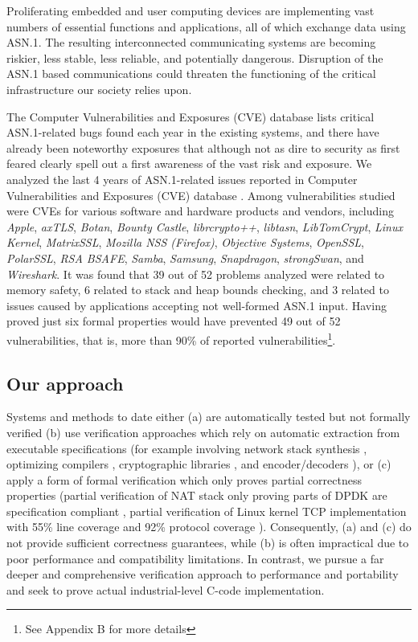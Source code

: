 \documentclass[acmsmall,nonacm]{acmart}
\begin{document}
Proliferating embedded and user computing devices are implementing
vast numbers of essential functions and applications, all of which
exchange data using ASN.1. The resulting interconnected communicating
systems are becoming riskier, less stable, less reliable, and
potentially dangerous. Disruption of the ASN.1 based communications
could threaten the functioning of the critical infrastructure our
society relies upon.


The Computer Vulnerabilities and Exposures (CVE) database
\cite{CVE} lists critical ASN.1-related bugs found each year in
the existing systems, and there have already been noteworthy exposures
\cite{OpenSSLMemoryCorruption} that although not as dire to security as first feared
\cite{ASN1Flaw} clearly spell out a first awareness of the vast risk and
exposure. We analyzed the last 4 years of ASN.1-related issues
reported in Computer Vulnerabilities and Exposures (CVE) database
\cite{CVEaddon}. Among vulnerabilities studied were CVEs for various
software and hardware products and vendors, including \textit{Apple},
\textit{axTLS}, \textit{Botan}, \textit{Bounty Castle},
\textit{librcrypto++}, \textit{libtasn}, \textit{LibTomCrypt},
\textit{Linux Kernel}, \textit{MatrixSSL}, \textit{Mozilla NSS
  (Firefox)}, \textit{Objective Systems}, \textit{OpenSSL},
\textit{PolarSSL}, \textit{RSA BSAFE}, \textit{Samba},
\textit{Samsung}, \textit{Snapdragon}, \textit{strongSwan}, and
\textit{Wireshark}. It was found that 39 out of 52 problems analyzed
were related to memory safety, 6 related to stack and heap bounds
checking, and 3 related to issues caused by applications accepting not
well-formed ASN.1 input. Having proved just six formal properties
would have prevented 49 out of 52 vulnerabilities, that is, more than
90\% of reported vulnerabilities\footnote{See Appendix B for more details}.


\subsection{Our approach}

Systems and methods to date either (a) are automatically tested but not
formally verified (b) use verification approaches which rely on
automatic extraction from executable specifications (for example
involving network stack synthesis \cite{VNSSforSel4}, optimizing compilers
\cite{CompCert}, cryptographic libraries \cite{HACL}, and
encoder/decoders \cite{Narcissus}), or (c) apply a form of formal
verification which only proves partial correctness properties (partial
verification of NAT stack only proving parts of DPDK are specification
compliant \cite{NAT}, partial verification of Linux kernel TCP
implementation with 55\% line coverage and 92\% protocol coverage
\cite{NSDI}). Consequently, (a) and (c) do not provide sufficient
correctness guarantees, while (b) is often impractical due to poor
performance and compatibility limitations. In contrast, we pursue a
far deeper and comprehensive verification approach to performance and
portability and seek to prove actual industrial-level C-code
implementation.
\end{document}
